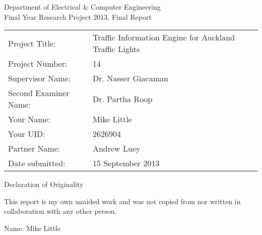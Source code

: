 \begin{titlepage}


\vspace*{15em}


\centering

{\LARGE
Department of Electrical \& Computer Engineering \\
Final Year Research Project 2013, Final Report}

\hspace{2em}

\begin{table*}[h]
\centering
\begin{tabular}{ll}
Project Title: & Traffic Information Engine for Auckland Traffic Lights \\
Project Number: & 14 \\
Supervisor Name: & Dr. Nasser Giacaman \\
Second Examiner Name: & Dr. Partha Roop \\
Your Name: & Mike Little \\
Your UID: & 2626904 \\
Partner Name: & Andrew Luey \\
Date submitted: & 15 September 2013 \\

\end{tabular}
\end{table*}
\begin{table}


\end{table}
\pagebreak

\vspace*{25em}

{\Large Declaration of Originality}

\hspace{5em}

This report is my own unaided work and was not copied from 
nor written in collaboration with any other person.

Name: Mike Little


\end{titlepage}


